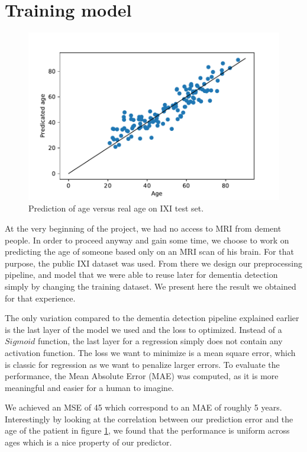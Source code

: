 \section{Training model}

\begin{figure}
 \centering
 \includegraphics[width=.9\linewidth]{figures/Age_pred_vs_age_IXI.pdf}
 \captionsetup{width=.9\linewidth}
 \caption{Prediction of age versus real age on IXI test set.}
 \label{fig:IXI_pred_vs_age}
\end{figure}

At the very beginning of the project, we had no access to MRI from dement people. In order to proceed anyway and gain some time, we choose to work on predicting the age of someone based only on an MRI scan of his brain. For that purpose, the public IXI dataset was used. From there we design our preprocessing pipeline, and model that we were able to reuse later for dementia detection simply by changing the training dataset. We present here the result we obtained for that experience.

The only variation compared to the dementia detection pipeline explained earlier is the last layer of the model we used and the loss to optimized. Instead of a $Sigmoid$ function, the last layer for a regression simply does not contain any activation function. The loss we want to minimize is a mean square error, which is classic for regression as we want to penalize larger errors. To evaluate the performance, the Mean Absolute Error (MAE) was computed, as it is more meaningful and easier for a human to imagine.


We achieved an MSE of 45 which correspond to an MAE of roughly 5 years. Interestingly by looking at the correlation between our prediction error and the age of the patient in figure \ref{fig:IXI_pred_vs_age}, we found that the performance is uniform across ages which is a nice property of our predictor.

